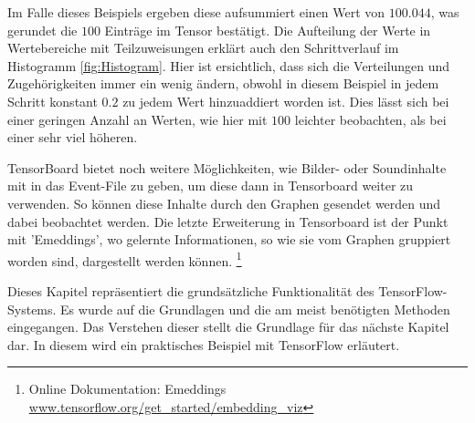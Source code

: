Im Falle dieses Beispiels ergeben diese aufsummiert einen Wert von $100.044$, was gerundet die $100$ Einträge im Tensor bestätigt. 
Die Aufteilung der Werte in Wertebereiche mit Teilzuweisungen erklärt auch den Schrittverlauf im Histogramm \ref{fig:Histogram}. 
Hier ist ersichtlich, dass sich die Verteilungen und Zugehörigkeiten immer ein wenig ändern, obwohl in diesem Beispiel in jedem Schritt konstant $0.2$ zu jedem Wert hinzuaddiert worden ist. 
Dies lässt sich bei einer geringen Anzahl an Werten, wie hier mit $100$ leichter beobachten, als bei einer sehr viel höheren. 
\phantom \newline

\noindent
TensorBoard bietet noch weitere Möglichkeiten, wie Bilder- oder Soundinhalte mit in das Event-File zu geben, um diese dann in Tensorboard weiter zu verwenden. 
So können diese Inhalte durch den Graphen gesendet werden und dabei beobachtet werden. 
Die letzte Erweiterung in Tensorboard ist der Punkt mit 'Emeddings', wo gelernte Informationen, so wie sie vom Graphen gruppiert worden sind, dargestellt werden können. \footnote{Online Dokumentation: Emeddings \url{www.tensorflow.org/get_started/embedding_viz}}
\phantom \newline

\noindent
Dieses Kapitel repräsentiert die grundsätzliche Funktionalität des TensorFlow-Systems. 
Es wurde auf die Grundlagen und die am meist benötigten Methoden eingegangen. 
Das Verstehen dieser stellt die Grundlage für das nächste Kapitel dar. 
In diesem wird ein praktisches Beispiel mit TensorFlow erläutert. 








